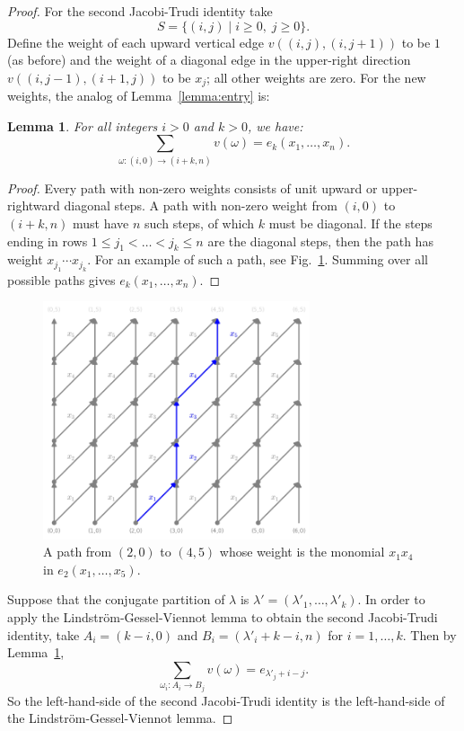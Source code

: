\documentclass[11pt]{amsproc}
\newtheorem{lemma}[theorem]{Lemma}
\theoremstyle{definition}
\theoremstyle{example}
\begin{document}
\begin{proof}
  For the second Jacobi-Trudi identity take
  \begin{displaymath}
    S = \{(i,j)\mid i\geq 0,\;j\geq 0\}.
  \end{displaymath}
  Define the weight of each upward vertical edge $v((i,j),(i,j+1))$ to be $1$ (as before) and the weight of a diagonal edge in the upper-right direction $v((i,j-1),(i+1,j))$ to be $x_j$; all other weights are zero.
  For the new weights, the analog of Lemma~\ref{lemma:entry} is:
  \begin{lemma}
    \label{lemma:entry-e}
    For all integers $i>0$ and $k>0$, we have:
    \begin{displaymath}
      \sum_{\omega:(i,0)\to (i+k,n)} v(\omega) = e_k(x_1,\dotsc,x_n).
    \end{displaymath}
  \end{lemma}
  \begin{proof}
    Every path with non-zero weights consists of unit upward or upper-rightward diagonal steps.
    A path with non-zero weight from $(i,0)$ to $(i+k,n)$ must have $n$ such steps, of which $k$ must be diagonal.
    If the steps ending in rows $1\leq j_1<\dotsc<j_k\leq n$ are the diagonal steps, then the path has weight $x_{j_1}\dotsb x_{j_k}$.
    For an example of such a path, see Fig.~\ref{fig:example_path_e}.
    Summing over all possible paths gives $e_k(x_1,\dotsc,x_n)$.
  \end{proof}
  \begin{figure}
    \centering
    \includegraphics[width=0.7\textwidth]{path_example2.png}
    \caption{A path from $(2,0)$ to $(4,5)$ whose weight is the monomial $x_1x_4$ in $e_2(x_1,\dotsc,x_5)$.}
    \label{fig:example_path_e}
  \end{figure}
  Suppose that the conjugate partition of $\lambda$ is $\lambda'=(\lambda'_1,\dotsc,\lambda'_k)$.
  In order to apply the Lindstr\"om-Gessel-Viennot lemma to obtain the second Jacobi-Trudi identity, take $A_i=(k-i, 0)$ and $B_i=(\lambda'_i+k-i, n)$ for $i=1,\dotsc,k$.
  Then by Lemma~\ref{lemma:entry-e},
  \begin{displaymath}
    \sum_{\omega_i:A_i\to B_j} v(\omega) = e_{\lambda'_j+i-j}.
  \end{displaymath}
  So the left-hand-side of the second Jacobi-Trudi identity is the left-hand-side of the Lindstr\"om-Gessel-Viennot lemma.


\end{proof}
\end{document}
